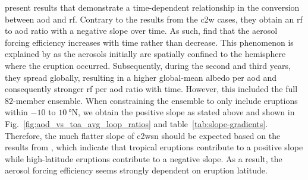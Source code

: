 \documentclass{ametsocV6.1}
\begin{document}
\citet[][their Fig.\ 1c,d]{marshall2020} present results that demonstrate a
time-dependent relationship in the conversion between \gls{aod} and \gls{rf}. Contrary
to the results from the \gls{c2w} cases, they obtain an \gls{rf} to \gls{aod} ratio with
a negative slope over time. As such, \citet{marshall2020} find that the aerosol forcing
efficiency increases with time rather than decrease. This phenomenon is explained by
\citet{marshall2020} as the aerosols initially are spatially confined to the hemisphere
where the eruption occurred. Subsequently, during the second and third years, they
spread globally, resulting in a higher global-mean albedo per \gls{aod} and consequently
stronger \gls{rf} per \gls{aod} ratio with time. However, this included the full
\(82\)-member ensemble. When constraining the ensemble to only include eruptions within
\(-10\) to \(\SI{10}{\degree\mathrm{N}}\), we obtain the positive slope as stated above
and shown in Fig.~\ref{fig:aod_vs_toa_avg_loop_ratios} and
table~\ref{tab:slope-gradients}. Therefore, the much flatter slope of \gls{c2wsn} should
be expected based on the results from \citet{marshall2020}, which indicate that tropical
eruptions contribute to a positive slope while high-latitude eruptions contribute to a
negative slope. As a result, the aerosol forcing efficiency seems strongly dependent on
eruption latitude.
\end{document}
